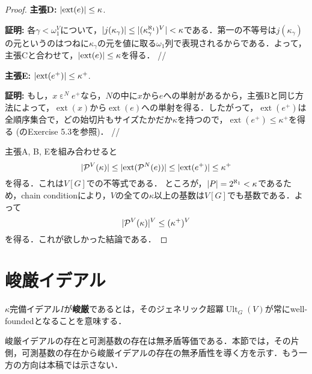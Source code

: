 \documentclass[uplatex]{jsarticle}
\newcommand{\Pow}{\mathcal{P}}
\newcommand{\Ult}{\operatorname{Ult}}
\newcommand{\ext}{\operatorname{ext}}
\DeclarePairedDelimiter\abs{\lvert}{\rvert}
\theoremstyle{definition}
\begin{document}
\begin{proof}
		\par \textbf{主張D: } $\abs{\ext(e)} \le \kappa$.
		\par \textbf{証明: } 各$\gamma < \omega_1^V$について，$\abs{j(\kappa_\gamma)} \le \abs{(\kappa_\gamma^{\aleph_1})^V} < \kappa$である．第一の不等号は$j(\kappa_\gamma)$の元というのはつねに$\kappa_\gamma$の元を値に取る$\omega_1$列で表現されるからである．よって，主張Cと合わせて，$\abs{\ext(e)} \le \kappa$を得る．  \hfill //
		
		\par \textbf{主張E: } $\abs{\ext(e^+)} \le \kappa^+$.
		\par \textbf{証明: } もし，$x \mathrel{\varepsilon}^N e^+$なら，$N$の中に$x$から$e$への単射があるから，主張Bと同じ方法によって，$\ext(x)$から$\ext(e)$への単射を得る．したがって，$\ext(e^+)$は全順序集合で，どの始切片もサイズたかだか$\kappa$を持つので，$\ext(e^+) \le \kappa^+$を得る (\cite{jech2006set}のExercise 5.3を参照)．	  \hfill //
		
		主張A, B, Eを組み合わせると
		\[
			\abs{\Pow^V(\kappa)} \le \abs{\ext(\Pow^N(e))} \le \abs{\ext(e^+)} \le \kappa^+
		\]
		を得る．これは$V[G]$での不等式である．
		ところが，$\abs{P} = 2^{\aleph_1} < \kappa$であるため，chain conditionにより，$V$の全ての$\kappa$以上の基数は$V[G]$でも基数である．よって
		\[
		\abs{\Pow^V(\kappa)}^V \le (\kappa^+)^V
		\]
		を得る．これが欲しかった結論である．
	 \end{proof}
	
	\section{峻厳イデアル}
	
	$\kappa$完備イデアル$I$が\textbf{峻厳}であるとは，そのジェネリック超冪$\Ult_G(V)$が常にwell-foundedとなることを意味する．
	
	峻厳イデアルの存在と可測基数の存在は無矛盾等価である．本節では，その片側，可測基数の存在から峻厳イデアルの存在の無矛盾性を導く方を示す．もう一方の方向は本稿では示さない．
	
\end{document}
